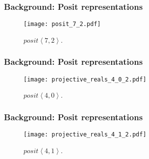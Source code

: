 %

\begin{frame}
    \frametitle{Background: Posit representations}
    \begin{figure}[H]
        \centering
        \texttt{[image: posit\_7\_2.pdf]}
        \caption{$posit\left \langle 7,2 \right \rangle$.}
    \end{figure}
\end{frame}
\begin{frame}
    \frametitle{Background: Posit representations}
    \begin{figure}[H]
        \centering
        \texttt{[image: projective\_reals\_4\_0\_2.pdf]}
        \caption{$posit\left \langle 4,0 \right \rangle$.}
    \end{figure}
\end{frame}
\begin{frame}
    \frametitle{Background: Posit representations}
    \begin{figure}[H]
        \centering
        \texttt{[image: projective\_reals\_4\_1\_2.pdf]}
        \caption{$posit\left \langle 4,1 \right \rangle$.}
    \end{figure}
\end{frame}

